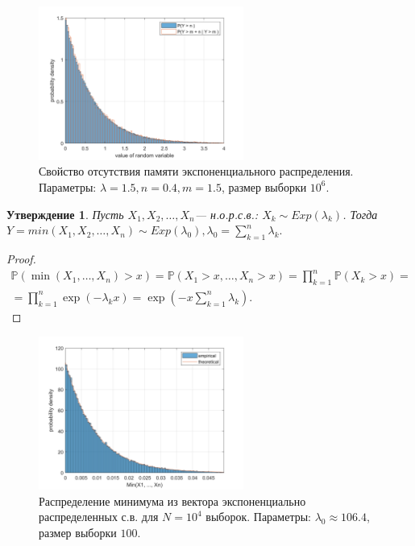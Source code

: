 \documentclass[oneside, final, 12pt]{article}
\def\P{{\mathbb{P} }}
\newtheorem{statement}{Утверждение}
\begin{document}
    \begin{figure}[h!]
		\centering
		\includegraphics[width=0.6\textwidth]{../code/Task_3/pict/mmls_prop_ex.png}
		\caption{Свойство отсутствия памяти экспоненциального распределения. 
		\newline \centering  Параметры: $\lambda= 1.5, n=0.4, m=1.5$, размер выборки $10^6$.}
    \end{figure}

	\newpage
	\begin{statement}
	Пусть $X_1,X_2, \ldots, X_n$--- н.о.р.с.в.: $X_k \sim Exp(\lambda_k)$. \newline
	Тогда $Y=min(X_1, X_2, \ldots,X_n )\sim Exp(\lambda_0), \lambda_0 = \sum\limits_{k=1}^n{\lambda_k}.$
 	\end{statement}
	\begin{proof}
        \begin{multline}
          \P(\min(X_1,\ldots, X_n) >x) = \P(X_1> x, \ldots, X_n>x)= \prod\limits_{k=1}^n\P(X_k> x) = \\
					 =  \prod\limits_{k=1}^n \exp(-\lambda_k x)=  \exp(-x \sum\limits_{k=1}^n \lambda_k ).
        \end{multline}
    \end{proof}
	
 	\begin{figure}[h!]
		\centering
		\includegraphics[width=0.6\textwidth]{../code/Task_3/pict/exp_min_ex.png}
		\caption{Распределение минимума из вектора экспоненциально распределенных с.в. 
		\newline \centering  для $N=10^4$ выборок. Параметры: $\lambda_0 \approx 106.4$, размер выборки $100$.}
    \end{figure}
	
\end{document}
